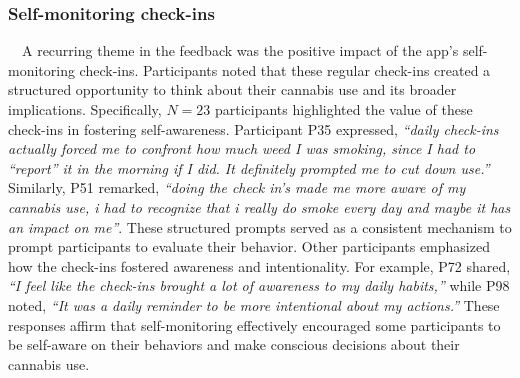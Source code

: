 \subsubsection{Self-monitoring check-ins}~\ A recurring theme in the feedback was the positive impact of the app's self-monitoring check-ins. Participants noted that these regular check-ins created a structured opportunity to think about their cannabis use and its broader implications. Specifically, $N=23$ participants highlighted the value of these check-ins in fostering self-awareness. Participant P35 expressed, \emph{``daily check-ins actually forced me to confront how much weed I was smoking, since I had to ``report'' it in the morning if I did. It definitely prompted me to cut down use.''} Similarly, P51 remarked,  \emph{``doing the check in’s made me more aware of my cannabis use, i had to recognize that i really do smoke every day and maybe it has an impact on me''}. These structured prompts served as a consistent mechanism to prompt participants to evaluate their behavior. Other participants emphasized how the check-ins fostered awareness and intentionality. For example, P72 shared, \emph{``I feel like the check-ins brought a lot of awareness to my daily habits,''} while P98 noted, \emph{``It was a daily reminder to be more intentional about my actions.''} These responses affirm that self-monitoring effectively encouraged some participants to be self-aware on their behaviors and make conscious decisions about their cannabis use.



